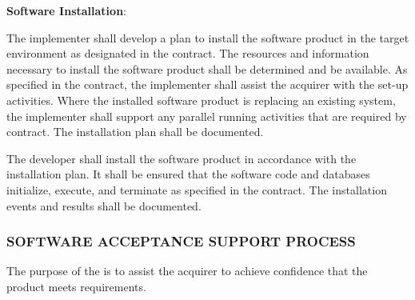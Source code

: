 			\begin{adjustwidth}{2em}{0pt} 

				\begin{compactenum}

					\item {\bf Software Installation}:

					\begin{compactenum}

						\item The implementer shall develop a plan to install the software product in the target environment as designated in the contract. The resources and information necessary to install the software product shall be determined and be available. As specified in the contract, the implementer shall assist the acquirer with the set-up activities.  Where the installed software product is replacing an existing system, the implementer shall support any parallel running activities that are required by contract. The installation plan shall be documented.

						\item The developer shall install the software product in accordance with the installation plan. It shall be ensured that the software code and databases initialize, execute, and terminate as specified in the contract. The installation events and results shall be documented.

					\end{compactenum}

				\end{compactenum}

			\end{adjustwidth}

		\newpage
		\subsubsection{SOFTWARE ACCEPTANCE SUPPORT PROCESS\label{proc:software_acceptance_support_process}}

			\begin{adjustwidth}{2em}{0pt} 

				The purpose of the  is to assist the acquirer to achieve confidence that the product meets requirements.

			\end{adjustwidth}

